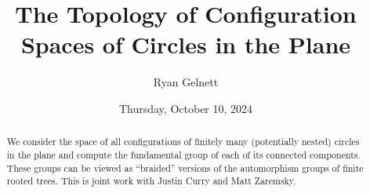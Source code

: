 \documentclass{UAmathtalk}
\author{Ryan Gelnett}
\title{The Topology of Configuration Spaces of Circles in the Plane}
\date{Thursday, October 10, 2024}
\begin{document}
\maketitle

\begin{abstract}
We consider the space of all configurations of finitely many (potentially nested) circles in the plane and compute the fundamental group of each of its connected components. These groups can be viewed as “braided” versions of the automorphism groups of finite rooted trees. This is joint work with Justin Curry and Matt Zaremsky.
\end{abstract}
\end{document}
